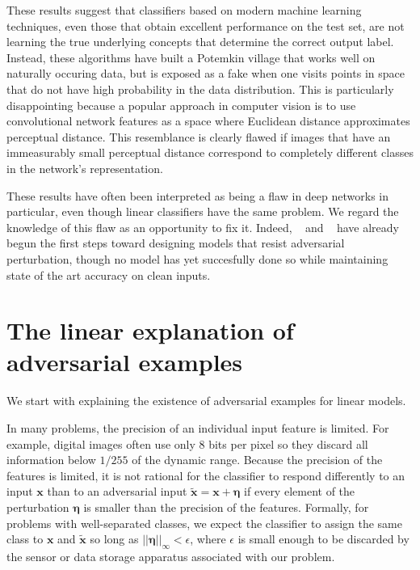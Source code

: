 \documentclass{article} %
\def\eps{{\epsilon}}
\def\veta{{\bm{\eta}}}
\def\vx{{\bm{x}}}
\begin{document}
These results suggest that classifiers based on modern machine learning techniques, even
those that obtain excellent performance on the test set, are not learning the true underlying
concepts that determine the correct output label. Instead, these algorithms
have built a Potemkin village that works well on naturally occuring data, but is exposed as
a fake when one visits points in space that do not have high probability in the data distribution.
This is particularly disappointing because a popular approach in computer vision is to use
convolutional network features as a space where Euclidean distance approximates perceptual distance.
This resemblance is clearly flawed if images that have an immeasurably small perceptual distance
correspond to completely different classes in the network's representation.

These results have often been interpreted as being a flaw in deep networks in particular, even
though linear classifiers have the same problem. We regard the knowledge of this flaw as an opportunity
to fix it. Indeed,
~\citet{Luca} and ~\citet{causal}
have already begun the first steps toward designing models that resist adversarial perturbation,
though no model has yet succesfully done so while maintaining state of the art accuracy on
clean inputs.

\section{The linear explanation of adversarial examples}

We start with explaining the existence of adversarial examples for linear models.

In many problems, the precision of an individual input feature is limited. For example, %
digital images often use only
8 bits per pixel so they discard all information below $1 / 255$ of the dynamic range.
 Because
 the precision of the features is limited, it is not rational for the classifier to
 respond differently to an input $\vx$ than to an adversarial input $\tilde{\vx} = \vx + \veta$
if every element of the perturbation $\veta$ is smaller than the precision of the features. Formally,
for problems with well-separated classes,
we expect the classifier to assign the same class to $\vx$ and $\tilde{\vx}$ so long as
$||\veta||_\infty < \eps$, where $\eps$ is small enough to be discarded by the
sensor or data storage apparatus associated with our problem.
\end{document}
